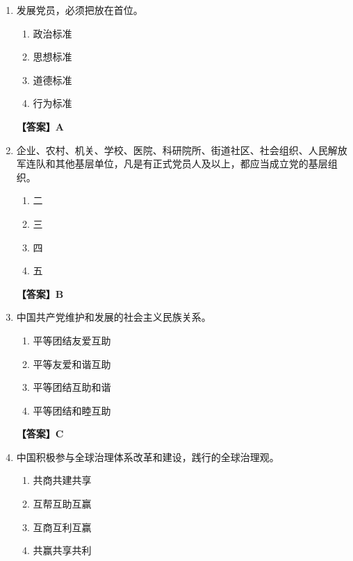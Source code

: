 \documentclass[UTF8,11pt,a4paper]{ctexart}
\begin{document}
\begin{enumerate}[label=\textbf{\arabic*.}, leftmargin=2.5em, itemsep=0.7em]
\begin{enumerate}[label=\Alph*., leftmargin=2em, itemsep=0.1em, topsep=0.15em]
\item 党的全国代表大会
\item 党的中央委员会
\item 党的中央政治局
\end{enumerate}
\textbf{【答案】A}
\item 发展党员，必须把\allowbreak\underline{\hspace{4em}}放在首位。
\begin{enumerate}[label=\Alph*., leftmargin=2em, itemsep=0.1em, topsep=0.15em]
\item 政治标准
\item 思想标准
\item 道德标准
\item 行为标准
\end{enumerate}
\textbf{【答案】A}
\item 企业、农村、机关、学校、医院、科研院所、街道社区、社会组织、人民解放军连队和其他基层单位，凡是有正式党员\allowbreak\underline{\hspace{4em}}人及以上，都应当成立党的基层组织。
\begin{enumerate}[label=\Alph*., leftmargin=2em, itemsep=0.1em, topsep=0.15em]
\item 二
\item 三
\item 四
\item 五
\end{enumerate}
\textbf{【答案】B}
\item 中国共产党维护和发展\allowbreak\underline{\hspace{4em}}的社会主义民族关系。
\begin{enumerate}[label=\Alph*., leftmargin=2em, itemsep=0.1em, topsep=0.15em]
\item 平等团结友爱互助
\item 平等友爱和谐互助
\item 平等团结互助和谐
\item 平等团结和睦互助
\end{enumerate}
\textbf{【答案】C}
\item 中国积极参与全球治理体系改革和建设，践行\allowbreak\underline{\hspace{4em}}的全球治理观。
\begin{enumerate}[label=\Alph*., leftmargin=2em, itemsep=0.1em, topsep=0.15em]
\item 共商共建共享
\item 互帮互助互赢
\item 互商互利互赢
\item 共赢共享共利

\end{enumerate}
\end{enumerate}
\end{document}
